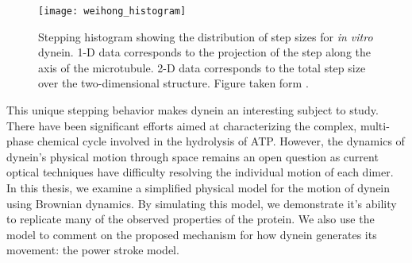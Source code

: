 \begin{figure}[!hbt]
	\centering
	\texttt{[image: weihong\_histogram]}
	\caption[Step size distribution]{Stepping histogram showing the distribution of step sizes for \textit{in vitro} dynein. 1-D data corresponds to the projection of the step along the axis of the microtubule. 2-D data corresponds to the total step size over the two-dimensional structure. Figure taken form \cite{qiu2012dynein}.}  
	\label{fig:weihong histogram} 
\end{figure}

This unique stepping behavior makes dynein an interesting subject to study. There have been significant efforts aimed at characterizing the complex, multi-phase chemical cycle involved in the hydrolysis of ATP\cite{cianfrocco2015mechanism}. However, the dynamics of dynein's physical motion through space remains an open question as current optical techniques have difficulty resolving the individual motion of each dimer. In this thesis, we examine a simplified physical model for the motion of dynein using Brownian dynamics. By simulating this model, we demonstrate it's ability to replicate many of the observed properties of the protein. We also use the model to comment on the proposed mechanism for how dynein generates its movement: the power stroke model. 

